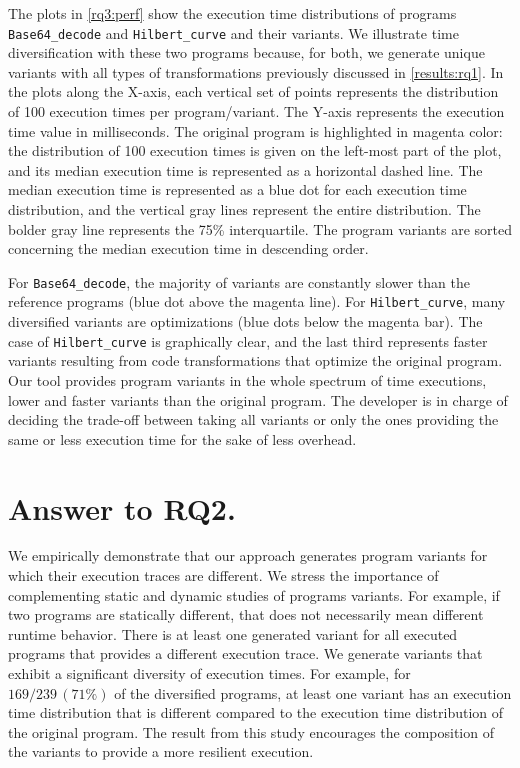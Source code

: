 The plots in \autoref{rq3:perf} show the execution time distributions of programs \texttt{Base64\_decode} and \texttt{Hilbert\_curve} and their variants. 
We illustrate time diversification with these two programs because, for both, we generate unique variants with all types of transformations previously discussed in \autoref{results:rq1}.
In the plots along the X-axis, each vertical set of points represents the distribution of 100 execution times per program/variant. The Y-axis represents the execution time value in milliseconds. The original program is highlighted in magenta color: the distribution of 100 execution times is given on the left-most part of the plot, and its median execution time is represented as a horizontal dashed line. The median execution time is represented as a blue dot for each execution time distribution, and the vertical gray lines represent the entire distribution. The bolder gray line represents the 75\% interquartile. The program variants are sorted concerning the median execution time in descending order.



For \texttt{Base64\_decode}, the majority of variants are constantly slower than the reference programs (blue dot above the magenta line). For \texttt{Hilbert\_curve}, many diversified variants are optimizations (blue dots below the magenta bar). The case of \texttt{Hilbert\_curve} is graphically clear, and the last third represents faster variants resulting from code transformations that optimize the original program.
Our tool provides program variants in the whole spectrum of time executions, lower and faster variants than the original program. The developer is in charge of deciding the trade-off between taking all variants or only the ones providing the same or less execution time for the sake of less overhead. 

\section{Answer to RQ2.}
We empirically demonstrate that our approach generates program variants for which their execution traces are different. We stress the importance of complementing static and dynamic studies of programs variants. For example, if two programs are statically different, that does not necessarily mean different runtime behavior. There is at least one generated variant for all executed programs that provides a different execution trace. 
We generate variants that exhibit a significant diversity of execution times. For example, for $169/239\,(71\%)$ of the diversified programs, at least one variant has an execution time distribution that is different compared to the execution time distribution of the original program. 
The result from this study encourages the composition of the variants to provide a more resilient execution.